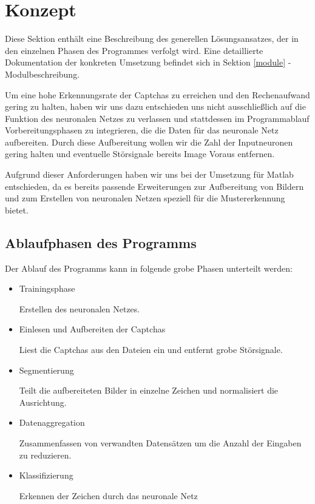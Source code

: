 \section{Konzept}

Diese Sektion enthält eine Beschreibung des generellen Lösungsansatzes, der in
den einzelnen Phasen des Programmes verfolgt wird. Eine detaillierte Dokumentation
der konkreten Umsetzung befindet sich in Sektion \ref{module} - Modulbeschreibung.

Um eine hohe Erkennungsrate der Captchas zu erreichen und den Rechenaufwand
gering zu halten, haben wir uns dazu entschieden
uns nicht ausschließlich auf die Funktion des neuronalen Netzes zu verlassen
und stattdessen im Programmablauf Vorbereitungsphasen zu integrieren, die die
Daten für das neuronale Netz aufbereiten. Durch diese Aufbereitung wollen wir
die Zahl der Inputneuronen gering halten und eventuelle Störsignale bereits Image
Voraus entfernen.

Aufgrund dieser Anforderungen haben wir uns bei der Umsetzung für Matlab entschieden, 
da es bereits passende Erweiterungen zur Aufbereitung von Bildern und zum
Erstellen von neuronalen Netzen speziell für die Mustererkennung bietet.


\subsection{Ablaufphasen des Programms}

Der Ablauf des Programms kann in folgende grobe Phasen unterteilt werden: 

\begin{itemize}

\item Trainingsphase

Erstellen des neuronalen Netzes.


\item Einlesen und Aufbereiten der Captchas

Liest die Captchas aus den Dateien ein und entfernt grobe Störsignale.


\item Segmentierung

Teilt die aufbereiteten Bilder in einzelne Zeichen und normalisiert die
Ausrichtung.


\item Datenaggregation

Zusammenfassen von verwandten Datensätzen um die Anzahl der Eingaben zu reduzieren.


\item Klassifizierung

Erkennen der Zeichen durch das neuronale Netz

\end{itemize}


